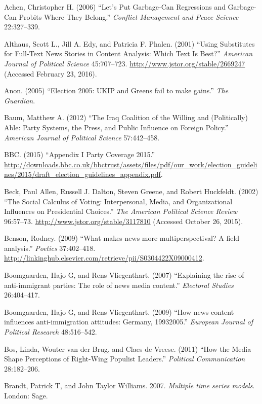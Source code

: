 \documentclass[12pt,article]{article}
\begin{document}
\raggedright

\setlength\parindent{0pt}

Achen, Christopher H. (2006) ``Let's Put Garbage-Can Regressions and
Garbage-Can Probits Where They Belong.'' \emph{Conflict Management and
Peace Science} 22:327--339.

Althaus, Scott L., Jill A. Edy, and Patricia F. Phalen. (2001) ``Using
Substitutes for Full-Text News Stories in Content Analysis: Which Text
Is Best?'' \emph{American Journal of Political Science} 45:707--723.
\url{http://www.jstor.org/stable/2669247} (Accessed February 23, 2016).

Anon. (2005) ``Election 2005: UKIP and Greens fail to make gains.''
\emph{The Guardian}.

Baum, Matthew A. (2012) ``The Iraq Coalition of the Willing and
(Politically) Able: Party Systems, the Press, and Public Influence on
Foreign Policy.'' \emph{American Journal of Political Science}
57:442--458.

BBC. (2015) ``Appendix I Party Coverage 2015.''
\url{http://downloads.bbc.co.uk/bbctrust/assets/files/pdf/our_work/election_guidelines/2015/draft_election_guidelines_appendix.pdf}.

Beck, Paul Allen, Russell J. Dalton, Steven Greene, and Robert
Huckfeldt. (2002) ``The Social Calculus of Voting: Interpersonal, Media,
and Organizational Influences on Presidential Choices.'' \emph{The
American Political Science Review} 96:57--73.
\url{http://www.jstor.org/stable/3117810} (Accessed October 26, 2015).

Benson, Rodney. (2009) ``What makes news more multiperspectival? A field
analysis.'' \emph{Poetics} 37:402--418.
\url{http://linkinghub.elsevier.com/retrieve/pii/S0304422X09000412}.

Boomgaarden, Hajo G, and Rens Vliegenthart. (2007) ``Explaining the rise
of anti-immigrant parties: The role of news media content.''
\emph{Electoral Studies} 26:404--417.

Boomgaarden, Hajo G, and Rens Vliegenthart. (2009) ``How news content
influences anti-immigration attitudes: Germany, 19932005.''
\emph{European Journal of Political Research} 48:516--542.

Bos, Linda, Wouter van der Brug, and Claes de Vreese. (2011) ``How the
Media Shape Perceptions of Right-Wing Populist Leaders.''
\emph{Political Communication} 28:182--206.

Brandt, Patrick T, and John Taylor Williams. 2007. \emph{Multiple time
series models}. London: Sage.
\end{document}
